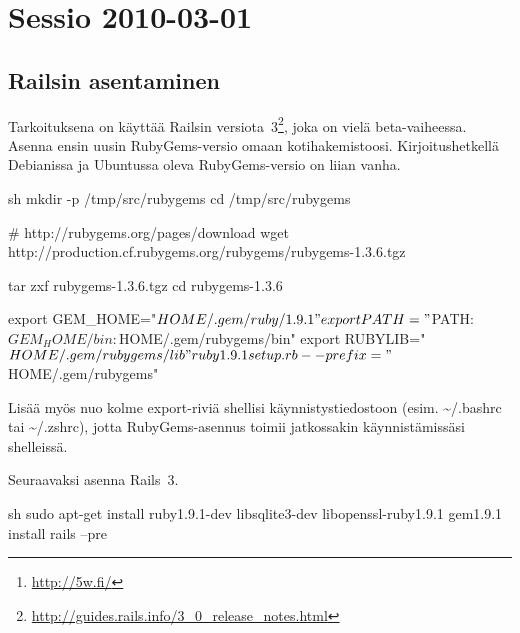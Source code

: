 \documentclass{article}
\title{\en{5w Ruby on Rails workshop}}
\author{Johan Kiviniemi}
\begin{document}
\maketitle

\begin{abstract}
Jotain dokumentaationtynkää 5w:n\footnote{\url{http://5w.fi/}}, Tampereen
hackerspacen, Rails-opiskeluprojektista.
\end{abstract}

\tableofcontents

\section{Sessio 2010-03-01}

\subsection{Railsin asentaminen}

\begin{samepage}
Tarkoituksena on käyttää Railsin
versiota~3\footnote{\url{http://guides.rails.info/3\_0\_release\_notes.html}},
joka on vielä beta-vaiheessa. Asenna ensin uusin RubyGems-versio omaan
kotihakemistoosi. Kirjoitushetkellä Debianissa ja Ubuntussa oleva
RubyGems-versio on liian vanha.

\begin{pygmented}{sh}
mkdir -p /tmp/src/rubygems
cd /tmp/src/rubygems

# http://rubygems.org/pages/download
wget http://production.cf.rubygems.org/rubygems/rubygems-1.3.6.tgz

tar zxf rubygems-1.3.6.tgz
cd rubygems-1.3.6

export GEM_HOME="$HOME/.gem/ruby/1.9.1"
export PATH="$PATH:$GEM_HOME/bin:$HOME/.gem/rubygems/bin"
export RUBYLIB="$HOME/.gem/rubygems/lib"

ruby1.9.1 setup.rb --prefix="$HOME/.gem/rubygems"
\end{pygmented}
\end{samepage}

Lisää myös nuo kolme export-riviä shellisi käynnistystiedostoon (esim.
\textasciitilde/.bashrc tai \textasciitilde/.zshrc), jotta RubyGems-asennus
toimii jatkossakin käynnistämissäsi shelleissä.

\begin{samepage}
Seuraavaksi asenna Rails~3.

\begin{pygmented}{sh}
sudo apt-get install ruby1.9.1-dev libsqlite3-dev libopenssl-ruby1.9.1
gem1.9.1 install rails --pre
\end{pygmented}
\end{samepage}
\end{document}
